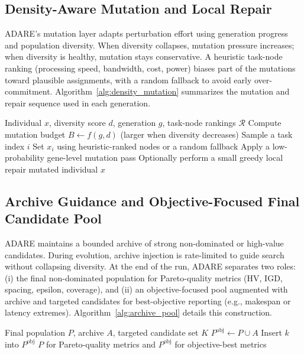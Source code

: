 \documentclass[preprint,12pt]{elsarticle}
\begin{document}
\subsection{Density-Aware Mutation and Local Repair}
ADARE's mutation layer adapts perturbation effort using generation progress and population diversity. When diversity collapses, mutation pressure increases; when diversity is healthy, mutation stays conservative. A heuristic task-node ranking (processing speed, bandwidth, cost, power) biases part of the mutations toward plausible assignments, with a random fallback to avoid early over-commitment. Algorithm~\ref{alg:density_mutation} summarizes the mutation and repair sequence used in each generation.

\begin{algorithm}[H]
\caption{Density-Aware Mutation with Heuristic Guidance}
\label{alg:density_mutation}
\small
\begin{algorithmic}[1]
\Require Individual $x$, diversity score $d$, generation $g$, task-node rankings $\mathcal{R}$
\State Compute mutation budget $B \gets f(g,d)$ (larger when diversity decreases)
    \State Sample a task index $i$
    \State Set $x_i$ using heuristic-ranked nodes or a random fallback
\EndFor
\State Apply a low-probability gene-level mutation pass
\State Optionally perform a small greedy local repair
\State \Return mutated individual $x$
\end{algorithmic}
\end{algorithm}

\subsection{Archive Guidance and Objective-Focused Final Candidate Pool}
ADARE maintains a bounded archive of strong non-dominated or high-value candidates. During evolution, archive injection is rate-limited to guide search without collapsing diversity. At the end of the run, ADARE separates two roles: (i) the final non-dominated population for Pareto-quality metrics (HV, IGD, spacing, epsilon, coverage), and (ii) an objective-focused pool augmented with archive and targeted candidates for best-objective reporting (e.g., makespan or latency extremes). Algorithm~\ref{alg:archive_pool} details this construction.

\begin{algorithm}[H]
\caption{Archive-Guided Final Objective Pool Construction}
\label{alg:archive_pool}
\small
\begin{algorithmic}[1]
\Require Final population $P$, archive $A$, targeted candidate set $K$
\State $P^{\mathrm{obj}} \gets P \cup A$
        \State Insert $k$ into $P^{\mathrm{obj}}$
    \EndIf
\EndFor
\State \Return $P$ for Pareto-quality metrics and $P^{\mathrm{obj}}$ for objective-best metrics
\end{algorithmic}
\end{algorithm}
\end{document}
